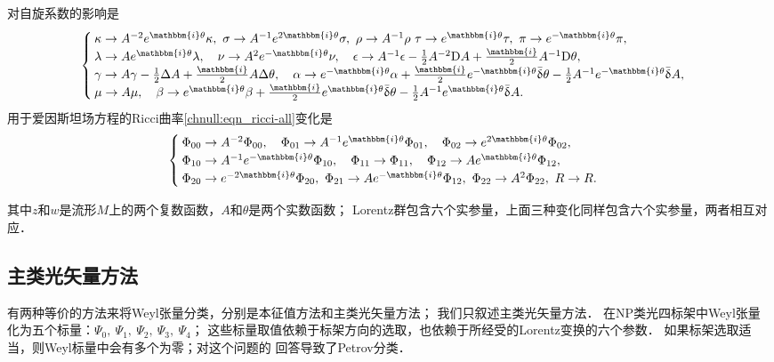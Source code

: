 对自旋系数的影响是
\setlength{\mathindent}{0em} 
\begin{equation}\label{chnull:eqn_Spin-III}
    \begin{cases}
        \kappa\to A^{-2} e^{\mathbbm{i}\theta}\kappa,\
        \sigma\to A^{-1} e^{2\mathbbm{i}\theta}\sigma,\
        \rho \to A^{-1}\rho \
        \tau \to e^{\mathbbm{i}\theta} \tau, \
        \pi \to e^{-\mathbbm{i}\theta} \pi,\\
        \lambda \to A e^{\mathbbm{i}\theta} \lambda,\quad
        \nu \to A^2 e^{-\mathbbm{i}\theta} \nu, \quad
        \epsilon\to A^{-1} \epsilon -\frac{1}{2}A^{-2}{\rm D}A
        + \frac{\mathbbm{i}}{2} A^{-1} {\rm D}\theta,       \\
        \gamma\to A \gamma -\frac{1}{2}\Delta A+ \frac{\mathbbm{i}}{2} A \Delta \theta,\quad
        \alpha\to e^{-\mathbbm{i}\theta}\alpha + \frac{\mathbbm{i}}{2} e^{-\mathbbm{i}\theta}
        \bar{\updelta}\theta -\frac{1}{2} A^{-1} e^{-\mathbbm{i}\theta}\bar{\updelta}A, \\
        \mu\to A\mu, \quad
        \beta\to e^{\mathbbm{i}\theta}\beta + \frac{\mathbbm{i}}{2} e^{\mathbbm{i}\theta}
        \bar{\updelta}\theta -\frac{1}{2} A^{-1} e^{\mathbbm{i}\theta}\bar{\updelta}A.
    \end{cases}
\end{equation}\setlength{\mathindent}{2em} 
用于爱因斯坦场方程的Ricci曲率\eqref{chnull:eqn_ricci-all}变化是
\begin{equation}\label{chnull:eqn_Einstein-III}
    \begin{cases}
        \Phi_{00}\to A^{-2} \Phi_{00} , \quad
        \Phi_{01}\to A^{-1} e^{\mathbbm{i}\theta} \Phi_{01}  , \quad
        \Phi_{02}\to e^{2\mathbbm{i}\theta} \Phi_{02}  , \\
        \Phi_{10}\to A^{-1} e^{-\mathbbm{i}\theta} \Phi_{10} , \quad
        \Phi_{11}\to \Phi_{11}, \quad
        \Phi_{12}\to A e^{\mathbbm{i}\theta} \Phi_{12}  , \\
        \Phi_{20}\to e^{-2\mathbbm{i}\theta} \Phi_{20}  , \
        \Phi_{21}\to A e^{-\mathbbm{i}\theta} \Phi_{12}  , \
        \Phi_{22}\to A^2 \Phi_{22}    , \
        R\to R.
    \end{cases}
\end{equation}



其中$z$和$w$是流形$M$上的两个复数函数，$A$和$\theta$是两个实数函数；
Lorentz群包含六个实参量，上面三种变化同样包含六个实参量，两者相互对应．


\subsection{主类光矢量方法}
有两种等价的方法来将Weyl张量分类，分别是本征值方法和主类光矢量方法；
我们只叙述主类光矢量方法．
在NP类光四标架中Weyl张量化为五个标量：$\Psi_0,\ \Psi_1,\ \Psi_2,\ \Psi_3,\ \Psi_4$；
这些标量取值依赖于标架方向的选取，也依赖于所经受的Lorentz变换的六个参数．
如果标架选取适当，则Weyl标量中会有多个为零；对这个问题的
回答导致了Petrov分类．

